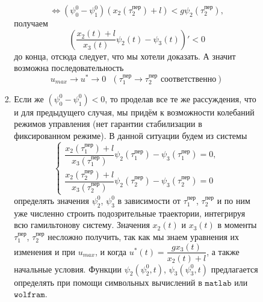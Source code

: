 \documentclass[a4paper,12pt]{article}
\begin{document}
\begin{itemize}
\begin{enumerate}
\begin{enumerate}
\begin{enumerate}
\[ \Leftrightarrow \left(\psi_{0}^0 - \psi_{1}^0\right)(x_2(\tau_2^{\text{пер}}) + l) < g\psi_2(\tau_2^{\text{пер}}), \]
получаем 
\[ \left(\dfrac{x_2(t) + l}{x_3(t)}\psi_2(t) - \psi_3(t)\right)' < 0 \] 
до конца, отсюда следует, что мы хотели доказать. А значит возможна последовательность 
$$\boxed{u_{max} \rightarrow u^* \rightarrow 0 \ \ \  (\tau_1^{\text{пер}} \rightarrow \tau_2^{\text{пер}} \text{ соответственно})}$$ 
\item Если же $(\psi_0^0 - \psi_1^0) < 0$, то проделав все те же рассуждения, что и для предыдущего случая, мы придём к возможности колебаний режимов управления (нет гарантии стабилизации в фиксированном режиме). В данной ситуации будем из системы 
$$\begin{cases}
	\dfrac{x_2(\tau_1^{\text{пер}}) + l}{x_3(\tau_1^{\text{пер}})}\psi_2(\tau_1^{\text{пер}}) - \psi_3(\tau_1^{\text{пер}}) = 0, \\
	\dfrac{x_2(\tau_2^{\text{пер}}) + l}{x_3(\tau_2^{\text{пер}})}\psi_2(\tau_2^{\text{пер}}) - \psi_3(\tau_2^{\text{пер}}) = 0
\end{cases}$$
определять значения $\psi_2^0$, $\psi_3^0$ в зависимости от $\tau_1^{\text{пер}}$, $\tau_2^{\text{пер}}$ и по ним уже численно строить подозрительные траектории, интегрируя всю гамильтонову систему. Значения $x_2(t)$ и $x_3(t)$ в моменты $\tau_1^{\text{пер}}$, $\tau_2^{\text{пер}}$ несложно получить, так как мы знаем уравнения их изменения и при $u_{max}$, и когда $u^*(t) = \dfrac{g x_3(t)}{x_2(t) + l}$, а также начальные условия. Функции $\psi_2(\psi_2^0, t)$, $\psi_3(\psi_3^0, t)$ предлагается определять при помощи символьных вычислений в $\texttt{matlab}$ или $\texttt{wolfram}$.
\end{enumerate}


\end{enumerate}
\end{enumerate}
\end{itemize}
\end{document}
